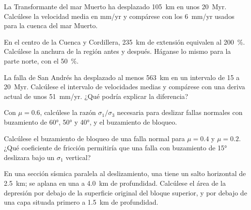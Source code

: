 \begin{exercise}[$\star$]\label{exo:b3:extension-strike-slip:3}
La Transformante del mar Muerto ha desplazado \qty{105}{km} en unos
\qty{20}{Myr}. Calcúlese la velocidad media en \unit{mm/yr} y compárese con los
\qty{6}{mm/yr} usados para la cuenca del mar Muerto.
\end{exercise}

\begin{exercise}[$\star$]\label{exo:b3:extension-strike-slip:4}
En el centro de la Cuenca y Cordillera, \qty{235}{km} de extensión equivalen
al \qty{200}{\percent}. Calcúlese la anchura de la región antes y después.
Háganse lo mismo para la parte norte, con el \qty{50}{\percent}.
\end{exercise}

\begin{exercise}[$\star\star$]\label{exo:b3:extension-strike-slip:5}
La falla de San Andrés ha desplazado al menos \qty{563}{km} en un intervalo de 15 a
\qty{20}{Myr}. Calcúlese el intervalo de velocidades medias y compárese con una
deriva actual de unos \qty{51}{mm/yr}. ¿Qué podría explicar la diferencia?
\end{exercise}

\begin{exercise}[$\star\star$]\label{exo:b3:extension-strike-slip:6}
Con $\mu = 0.6$, calcúlese la razón $\sigma_1/\sigma_3$ necesaria para deslizar
fallas normales con buzamiento de \ang{60}, \ang{50} y \ang{40}, y el buzamiento de bloqueo.
\end{exercise}

\begin{exercise}[$\star\star$]\label{exo:b3:extension-strike-slip:7}
Calcúlese el buzamiento de bloqueo de una falla normal para $\mu = 0.4$ y
$\mu = 0.2$. ¿Qué coeficiente de fricción permitiría que una falla con
buzamiento de \ang{15} deslizara bajo un $\sigma_1$ vertical?
\end{exercise}

\begin{exercise}[$\star\star$]\label{exo:b3:extension-strike-slip:8}
En una sección sísmica paralela al deslizamiento, una  tiene un salto horizontal de
\qty{2.5}{km}; se aplana en una  a \qty{4.0}{km} de profundidad. Calcúlese el área
de la depresión por debajo de la superficie original del bloque superior, y por debajo de una capa
situada primero a \qty{1.5}{km} de profundidad.
\end{exercise}

